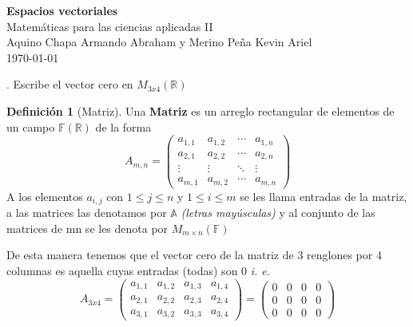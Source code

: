 \documentclass[letterpaper]{article}
\newcommand{\F}{\mathds{F}}
\newcommand{\R}{\mathds{R}}
\renewcommand{\*}{\cdot}
\theoremstyle{definition}
\newtheorem{definition}{Definición}
\begin{document}
		\begin{titlepage}
		\begin{center}
			\Large{\textbf{Espacios vectoriales}} \\[0.1cm]
			\huge{Matemáticas para las ciencias aplicadas II}\\[0.2cm]
			\large{Aquino Chapa Armando Abraham y Merino Peña Kevin Ariel }
			\\
			\today
		\end{center}
		\let\newpage\relax%
		\hrulefill
	\end{titlepage}

	
	. Escribe el vector cero en $M_{3x4}(\mathbb{R})$
		\begin{definition}[Matriz]
		Una \textbf{Matriz} es un arreglo rectangular de elementos de un campo $ \F(\R) $ de la forma
		\begin{equation*}
		A_{m,n} = 
		\begin{pmatrix}
		a_{1,1} & a_{1,2} & \cdots & a_{1,n} \\
		a_{2,1} & a_{2,2} & \cdots & a_{2,n} \\
		\vdots  & \vdots  & \ddots & \vdots  \\
		a_{m,1} & a_{m,2} & \cdots & a_{m,n} 
		\end{pmatrix}
		\end{equation*}
		A los elementos $ a_{i,j} $ con $ 1 \leq j \leq n $ y $ 1 \leq i \leq m $ se les llama entradas de la matriz, a las matrices las denotamos por $ \mathds{A} $ 				\textit{(letras mayúsculas)} y al conjunto de las matrices de mn se les denota por $ M_{m\times n}(\F) $
		
	\end{definition}
	De esta manera tenemos que el vector cero de la matriz de 3 renglones por 4 columnas es aquella cuyas entradas (todas) son 0 \textit{i. e. }
		\begin{equation*}
		A_{3x4} = 
		\begin{pmatrix}
		a_{1,1} & a_{1,2} & a_{1,3} & a_{1,4} \\
		a_{2,1} & a_{2,2} & a_{2,3} & a_{2,4} \\
		a_{3,1} & a_{3,2} & a_{3,3} & a_{3,4} 
		\end{pmatrix}
		= 
		\begin{pmatrix}
		0 & 0 & 0 & 0\\
		0 & 0 & 0 & 0 \\
		0 & 0 & 0 & 0
		\end{pmatrix}
		\end{equation*}
		
\end{document}
